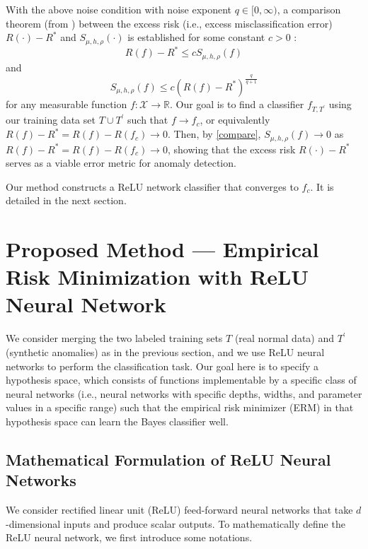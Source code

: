 \documentclass{article}
\def\RR{\mathbb R}
\begin{document}
 With the above noise condition with noise exponent $q \in [0,\infty)$, a comparison theorem (from \citet[Theorem 10]{steinwart2005classification}) between the excess risk (i.e., excess misclassification error)  $R(\cdot) - R^*$ and $S_{\mu,h,\rho}(\cdot)$ is established for some constant $c>0$ :
\begin{equation}
   R(f) - R^* \leq c S_{\mu,h,\rho}(f)
\end{equation}
and 
\begin{equation}\label{compare}
    S_{\mu,h,\rho}(f) \leq c \left(R(f) - R^*\right)^{\frac{q}{q+1}}
\end{equation}
for any measurable function $f: \mathcal{X} \to \RR$. 
Our goal is to find a classifier $f_{T,T^\prime}$ using our training data set $T\cup T^\prime$ such that $f \to f_c$, or equivalently $R(f)- R^* = R(f)- R(f_c) \to 0$. 
Then, by \eqref{compare}, $S_{\mu,h,\rho}(f) \to 0$ as $R(f)- R^* = R(f)- R(f_c) \to 0$, showing that the excess risk 
$R(\cdot) - R^*$ serves as a viable error metric for anomaly detection. 

Our method constructs a ReLU network classifier that converges to $f_c$. It is detailed in the next section.
\section{Proposed Method --- Empirical Risk Minimization with ReLU Neural Network}
\label{section:proposed method}
We consider merging the two labeled training sets $T$ (real normal data) and $T^\prime$ (synthetic anomalies) as in the previous section, and we use ReLU neural networks to perform the classification task. 
Our goal here is to specify a hypothesis space, which consists of functions implementable by a specific class of neural networks (i.e., neural networks with specific depths, widths, and parameter values in a specific range) such that the empirical risk minimizer (ERM) in that hypothesis space can learn the Bayes classifier well. 

\subsection{Mathematical Formulation of ReLU Neural Networks}
We consider rectified linear unit (ReLU) feed-forward neural networks that take $d$-dimensional inputs and produce scalar outputs.
To mathematically define the ReLU neural network, we first introduce some notations.
\end{document}
